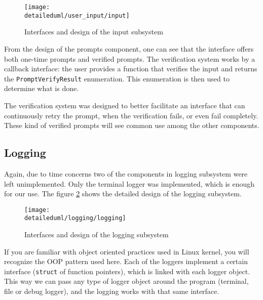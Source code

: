 \begin{figure}[H]
    \centering
    \centerline{\texttt{[image: \\detaileduml/user\_input/input]}}
    \caption{Interfaces and design of the input subsystem}
    \label{dia:prompts_design}
\end{figure}

From the design of the prompts component, one can see that the interface offers
both one-time prompts and verified prompts. The verification system works by
a callback interface: the user provides a function that verifies the input and
returns the \texttt{PromptVerifyResult} enumeration. This enumeration is then
used to determine what is done.

The verification system was designed to better facilitate an interface that
can continuously retry the prompt, when the verification fails, or even fail
completely. These kind of verified prompts will see common use among the other
components.

\subsection{Logging}

Again, due to time concerns two of the components in logging subsystem were
left unimplemented. Only the terminal logger was implemented, which is enough
for our use. The figure \ref{dia:logging_design} shows the detailed design of
the logging subsystem.

\begin{figure}[H]
    \centering
    \centerline{\texttt{[image: \\detaileduml/logging/logging]}}
    \caption{Interfaces and design of the logging subsystem}
    \label{dia:logging_design}
\end{figure}

If you are familiar with object oriented practices used in Linux kernel, you
will recognize the OOP pattern used here. Each of the loggers implement a
certain interface (\texttt{struct} of function pointers), which is linked with
each logger object. This way we can pass any type of logger object around the
program (terminal, file or debug logger), and the logging works with that same
interface.
